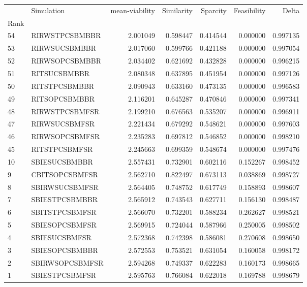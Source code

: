 \begin{tabular}{llrrrrr}
 & Simulation & mean-viability & Similarity & Sparcity & Feasibility & Delta \\
Rank &  &  &  &  &  &  \\
54 & RI\-RWS\-TPC\-SBM\-BBR & 2.001049 & 0.598447 & 0.414544 & 0.000000 & 0.997135 \\
53 & RI\-RWS\-UC\-SBM\-BBR & 2.017060 & 0.599766 & 0.421188 & 0.000000 & 0.997054 \\
52 & RI\-RWS\-OPC\-SBM\-BBR & 2.034402 & 0.621692 & 0.432828 & 0.000000 & 0.996215 \\
51 & RI\-TS\-UC\-SBM\-BBR & 2.080348 & 0.637895 & 0.451954 & 0.000000 & 0.997126 \\
50 & RI\-TS\-TPC\-SBM\-BBR & 2.090943 & 0.633160 & 0.473135 & 0.000000 & 0.996583 \\
49 & RI\-TS\-OPC\-SBM\-BBR & 2.116201 & 0.645287 & 0.470846 & 0.000000 & 0.997341 \\
48 & RI\-RWS\-TPC\-SBM\-FSR & 2.199210 & 0.676563 & 0.535207 & 0.000000 & 0.996911 \\
47 & RI\-RWS\-UC\-SBM\-FSR & 2.221434 & 0.679292 & 0.548621 & 0.000000 & 0.997603 \\
46 & RI\-RWS\-OPC\-SBM\-FSR & 2.235283 & 0.697812 & 0.546852 & 0.000000 & 0.998210 \\
45 & RI\-TS\-TPC\-SBM\-FSR & 2.245663 & 0.699359 & 0.548674 & 0.000000 & 0.997476 \\
10 & SBI\-ES\-UC\-SBM\-BBR & 2.557431 & 0.732901 & 0.602116 & 0.152267 & 0.998452 \\
9 & CBI\-TS\-OPC\-SBM\-FSR & 2.562710 & 0.822497 & 0.673113 & 0.038869 & 0.998727 \\
8 & SBI\-RWS\-UC\-SBM\-FSR & 2.564405 & 0.748752 & 0.617749 & 0.158893 & 0.998607 \\
7 & SBI\-ES\-TPC\-SBM\-BBR & 2.565912 & 0.743543 & 0.627711 & 0.156130 & 0.998487 \\
6 & SBI\-TS\-TPC\-SBM\-FSR & 2.566070 & 0.732201 & 0.588234 & 0.262627 & 0.998521 \\
5 & SBI\-ES\-OPC\-SBM\-FSR & 2.569915 & 0.724044 & 0.587966 & 0.250005 & 0.998502 \\
4 & SBI\-ES\-UC\-SBM\-FSR & 2.572368 & 0.742398 & 0.586081 & 0.270608 & 0.998650 \\
3 & SBI\-ES\-OPC\-SBM\-BBR & 2.572553 & 0.753521 & 0.631054 & 0.160058 & 0.998172 \\
2 & SBI\-RWS\-OPC\-SBM\-FSR & 2.594268 & 0.749337 & 0.622283 & 0.160173 & 0.998665 \\
1 & SBI\-ES\-TPC\-SBM\-FSR & 2.595763 & 0.766084 & 0.622018 & 0.169788 & 0.998679 \\
\end{tabular}
